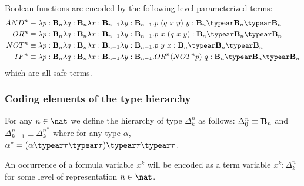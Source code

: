 Boolean functions are encoded by the following level-parameterized terms:
\begin{align*}
AND^n &\equiv \lambda p : \booltype_n \lambda q : \booltype_n \lambda x:\booltype_{n-1} \lambda y:\booltype_{n-1} . p~(q~x~y)~y : \booltype_n\typear\booltype_n\typear\booltype_n \\
OR^n &\equiv \lambda p : \booltype_n \lambda q : \booltype_n \lambda x:\booltype_{n-1} \lambda y:\booltype_{n-1} . p~x~(q~x~y) : \booltype_n\typear\booltype_{n}\typear\booltype_n \\
NOT^n &\equiv \lambda p : \booltype_n \lambda q : \booltype_n \lambda x:\booltype_{n-1} \lambda y:\booltype_{n-1} . p~y~x : \booltype_n\typear\booltype_n\typear\booltype_n \\
IF^n &\equiv \lambda p : \booltype_n \lambda q : \booltype_n \lambda x:\booltype_{n-1} \lambda y:\booltype_{n-1} . OR^n (NOT^n p)~q : \booltype_n\typear\booltype_n\typear\booltype_n
\end{align*}
which are all safe terms.

\subsubsection{Coding elements of the type hierarchy}
For any $n\in\nat$ we define the hierarchy of type $\Delta_k^n$ as follows:
$\Delta_0^n \equiv \mathbf{B}_n$ and $\Delta_{k+1}^n \equiv {\Delta_k^n}^*$ where for any type $\alpha$, $\alpha^* = (\alpha \typear \tau \typear \tau)\typear \tau \typear \tau$.

An occurrence of a formula variable $x^k$ will be encoded as a term variable $x^k:\Delta_{k}^n$ for some level of representation $n\in\nat$.

